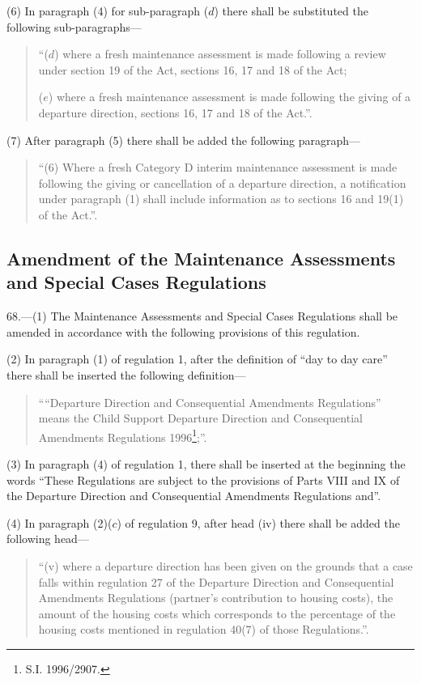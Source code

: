 \documentclass[a4paper]{article}
\begin{document}
(6) In paragraph (4) for sub-paragraph ($d$) there shall be substituted the
following sub-paragraphs—
\begin{quotation}
“($d$) where a fresh maintenance assessment is made following a review under
section 19 of the Act, sections 16, 17 and 18 of the Act;

($e$) where a fresh maintenance assessment is made following the giving of a
departure direction, sections 16, 17 and 18 of the Act.”.
\end{quotation}

(7) After paragraph (5) there shall be added the following paragraph—
\begin{quotation}
“(6) Where a fresh Category D interim maintenance assessment is made following
the giving or cancellation of a departure direction, a notification under
paragraph (1) shall include information as to sections 16 and 19(1) of the
Act.”.
\end{quotation}

\subsection[68. Amendment of the Maintenance Assessments and Special Cases Regulations]{Amendment of the Maintenance Assessments and Special Cases Regulations}

68.—(1)
The Maintenance Assessments and Special Cases Regulations shall be amended in
accordance with the following provisions of this regulation.

(2) In paragraph (1) of regulation 1, after the definition of “day to day care”
there shall be inserted the following definition—
\begin{quotation}
““Departure Direction and Consequential Amendments Regulations” means the Child
Support Departure Direction and Consequential Amendments Regulations 1996\footnote{\frenchspacing S.I. 1996/2907.};”.
\end{quotation}

(3) In paragraph (4) of regulation 1, there shall be inserted at the beginning
the words “These Regulations are subject to the provisions of Parts VIII and IX
of the Departure Direction and Consequential Amendments Regulations and”.

(4) In paragraph (2)($c$) of regulation 9, after head (iv) there shall be added
the following head—
\begin{quotation}
“(v) where a departure direction has been given on the grounds that a case falls
within regulation 27 of the Departure Direction and Consequential Amendments
Regulations (partner’s contribution to housing costs), the amount of the housing
costs which corresponds to the percentage of the housing costs mentioned in
regulation 40(7) of those Regulations.”.
\end{quotation}
\end{document}
